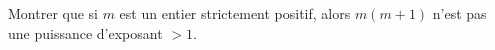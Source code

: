 Montrer que si $m$ est un entier strictement positif, alors $m(m + 1)$ n'est pas une puissance d'exposant $> 1$.
